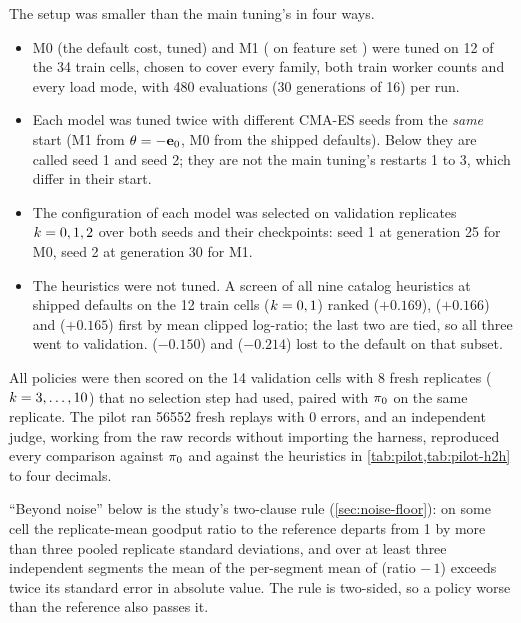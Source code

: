 The setup was smaller than the main tuning's in four ways.
\begin{itemize}
  \item M0 (the default cost, tuned) and M1 (\lc{} on feature set ) were tuned on 12 of
    the 34 train cells, chosen to cover every family, both train worker counts and every load
    mode, with 480 evaluations (30 generations of 16) per run.
  \item Each model was tuned twice with different CMA-ES seeds from the \emph{same} start
    (M1 from $\theta = -\mathbf{e}_{0}$, M0 from the shipped defaults). Below they are called seed 1
    and seed 2; they are not the main tuning's restarts 1 to 3, which differ in their start.
  \item The configuration of each model was selected on validation replicates $k = 0, 1, 2$
    over both seeds and their checkpoints: seed 1 at generation 25 for M0, seed 2 at generation
    30 for M1.
  \item The heuristics were not tuned. A screen of all nine catalog heuristics at shipped
    defaults on the 12 train cells ($k = 0, 1$) ranked 
    ($+0.169$),  ($+0.166$) and  ($+0.165$) first by mean clipped
    log-ratio; the last two are tied, so all three went to validation. 
    ($-0.150$) and  ($-0.214$) lost to the default on that subset.
\end{itemize}
All policies were then scored on the 14 validation cells with 8 fresh replicates
($k = 3,\dots,10$) that no selection step had used, paired with $\pi_{0}$ on the same
replicate. The pilot ran \num{56552} fresh replays with 0 errors, and an independent judge,
working from the raw records without importing the harness, reproduced every comparison against
$\pi_{0}$ and against the heuristics in \cref{tab:pilot,tab:pilot-h2h} to four decimals.

``Beyond noise'' below is the study's two-clause rule (\cref{sec:noise-floor}): on some cell
the replicate-mean goodput ratio to the reference departs from 1 by more than three pooled
replicate standard deviations, and over at least three independent segments the mean of the
per-segment mean of (ratio $-\,1$) exceeds twice its standard error in absolute value. The rule
is two-sided, so a policy worse than the reference also passes it.

